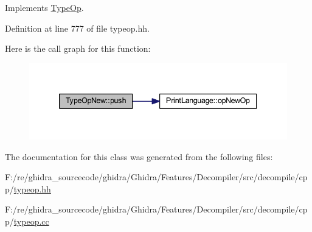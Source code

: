 Implements \mbox{\hyperlink{class_type_op_ac9c9544203ed74dabe6ac662b653b2af}{Type\+Op}}.



Definition at line 777 of file typeop.\+hh.

Here is the call graph for this function\+:
\nopagebreak
\begin{figure}[H]
\begin{center}
\leavevmode
\includegraphics[width=339pt]{class_type_op_new_afd623815d8c19c3cdd8e1d3d439e932c_cgraph}
\end{center}
\end{figure}


The documentation for this class was generated from the following files\+:\begin{DoxyCompactItemize}
\item 
F\+:/re/ghidra\+\_\+sourcecode/ghidra/\+Ghidra/\+Features/\+Decompiler/src/decompile/cpp/\mbox{\hyperlink{typeop_8hh}{typeop.\+hh}}\item 
F\+:/re/ghidra\+\_\+sourcecode/ghidra/\+Ghidra/\+Features/\+Decompiler/src/decompile/cpp/\mbox{\hyperlink{typeop_8cc}{typeop.\+cc}}\end{DoxyCompactItemize}
